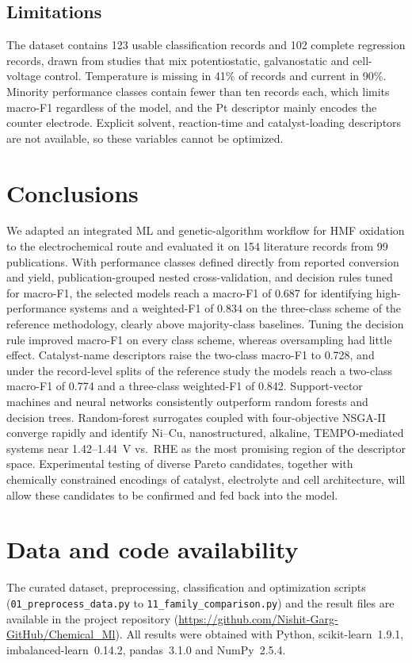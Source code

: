 \documentclass[10pt,a4paper]{article}
\newcommand{\FoneCtwo}{0.687}        \newcommand{\FoneCtwoSD}{0.042}
\newcommand{\FoneCthreePW}{0.834}    \newcommand{\BaseCthreeP}{0.310}
\newcommand{\FoneCtwoText}{0.728}    \newcommand{\FoneCtwoTextSD}{0.028}
\newcommand{\RecCtwo}{0.774}         \newcommand{\RecCtwoW}{0.817}
\newcommand{\RecCthreePW}{0.842}
\begin{document}
\subsection{Limitations}
\label{sec:limitations}

The dataset contains 123 usable classification records and 102 complete
regression records, drawn from studies that mix potentiostatic,
galvanostatic and cell-voltage control. Temperature is missing in 41\% of
records and current in 90\%. Minority performance classes contain fewer than
ten records each, which limits macro-F1 regardless of the model, and the Pt
descriptor mainly encodes the counter electrode.
Explicit solvent, reaction-time and catalyst-loading descriptors are not
available, so these variables cannot be optimized.

\section{Conclusions}
\label{sec:conclusions}

We adapted an integrated ML and genetic-algorithm workflow for HMF oxidation to
the electrochemical route and evaluated it on 154 literature records from 99
publications. With performance classes defined directly from reported
conversion and yield, publication-grouped nested cross-validation, and decision
rules tuned for macro-F1, the selected models reach a macro-F1 of \FoneCtwo{}
for identifying high-performance systems and a weighted-F1 of \FoneCthreePW{}
on the three-class scheme of the reference methodology, clearly above
majority-class baselines. Tuning the decision rule improved macro-F1 on every
class scheme, whereas oversampling had little effect. Catalyst-name
descriptors raise the two-class macro-F1 to \FoneCtwoText{}, and under the
record-level splits of the reference study the models reach a two-class
macro-F1 of \RecCtwo{} and a three-class weighted-F1 of \RecCthreePW{}.
Support-vector machines and neural networks consistently outperform random
forests and decision trees. Random-forest
surrogates coupled with four-objective NSGA-II converge rapidly and identify
Ni--Cu, nanostructured, alkaline, TEMPO-mediated systems near 1.42--1.44~V vs.\
RHE as the most promising region of the descriptor space. Experimental testing
of diverse Pareto candidates, together with chemically constrained encodings of
catalyst, electrolyte and cell architecture, will allow these candidates to be
confirmed and fed back into the model.

\section*{Data and code availability}
The curated dataset, preprocessing, classification and optimization scripts
(\texttt{01\_preprocess\_data.py} to \texttt{11\_family\_comparison.py}) and the
result files are available in the project repository
(\url{https://github.com/Nishit-Garg-GitHub/Chemical_Ml}). All results were
obtained with Python, scikit-learn~1.9.1, imbalanced-learn~0.14.2, pandas~3.1.0
and NumPy~2.5.4.



\end{document}

